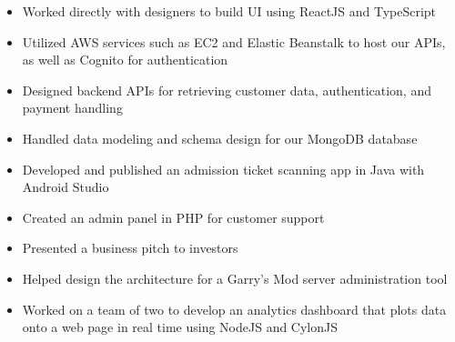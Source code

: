 \documentclass{cv}
\begin{document}
	\begin{itemize}
		\item Worked directly with designers to build UI using ReactJS and TypeScript
		\item Utilized AWS services such as EC2 and Elastic Beanstalk to host our APIs, as well as Cognito for authentication
		\item Designed backend APIs for retrieving customer data, authentication, and payment handling
		\item Handled data modeling and schema design for our MongoDB database
	\end{itemize}

	\begin{itemize}
		\item Developed and published an admission ticket scanning app in Java with Android Studio
		\item Created an admin panel in PHP for customer support 
		\item Presented a business pitch to investors
	\end{itemize}

	\begin{itemize}
		\item Helped design the architecture for a Garry’s Mod server administration tool
	\end{itemize}

	\begin{itemize}
		\item Worked on a team of two to develop an analytics dashboard that plots data onto a web page in real time using NodeJS and CylonJS
	\end{itemize}


	
\end{document}
